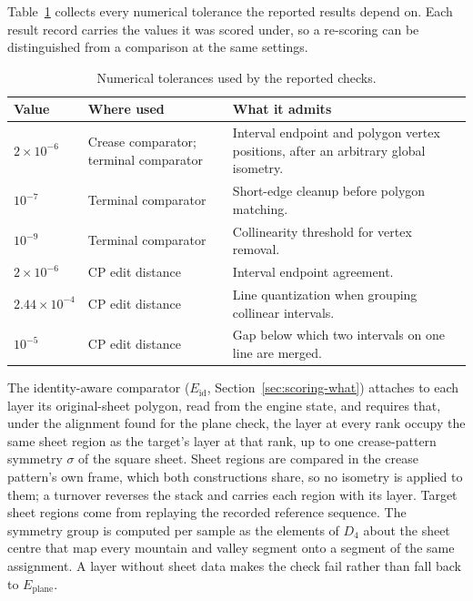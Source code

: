 Table~\ref{tab:tolerances} collects every numerical tolerance the reported results depend on.
Each result record carries the values it was scored under, so a re-scoring can be distinguished
from a comparison at the same settings.

\begin{table}[h]
\centering
\caption{Numerical tolerances used by the reported checks.}
\label{tab:tolerances}
\begin{tabular}{llp{}}
\hline
Value & Where used & What it admits \\
\hline
$2\times10^{-6}$ & Crease comparator; terminal comparator & Interval endpoint and polygon vertex
positions, after an arbitrary global isometry. \\
$10^{-7}$ & Terminal comparator & Short-edge cleanup before polygon matching. \\
$10^{-9}$ & Terminal comparator & Collinearity threshold for vertex removal. \\
$2\times10^{-6}$ & CP edit distance & Interval endpoint agreement. \\
$2.44\times10^{-4}$ & CP edit distance & Line quantization when grouping collinear intervals. \\
$10^{-5}$ & CP edit distance & Gap below which two intervals on one line are merged. \\
\hline
\end{tabular}
\end{table}

The identity-aware comparator ($E_{\mathrm{id}}$, Section~\ref{sec:scoring-what}) attaches to
each layer its original-sheet polygon, read from the engine state, and requires that, under the
alignment found for the plane check, the layer at every rank occupy the same sheet region as the
target's layer at that rank, up to one crease-pattern symmetry $\sigma$ of the square sheet.
Sheet regions are compared in the crease pattern's own frame, which both constructions share, so
no isometry is applied to them; a turnover reverses the stack and carries each region with its
layer. Target sheet regions come from replaying the recorded reference sequence. The symmetry
group is computed per sample as the elements of $D_4$ about the sheet centre that map every
mountain and valley segment onto a segment of the same assignment. A layer without sheet data
makes the check fail rather than fall back to $E_{\mathrm{plane}}$.

